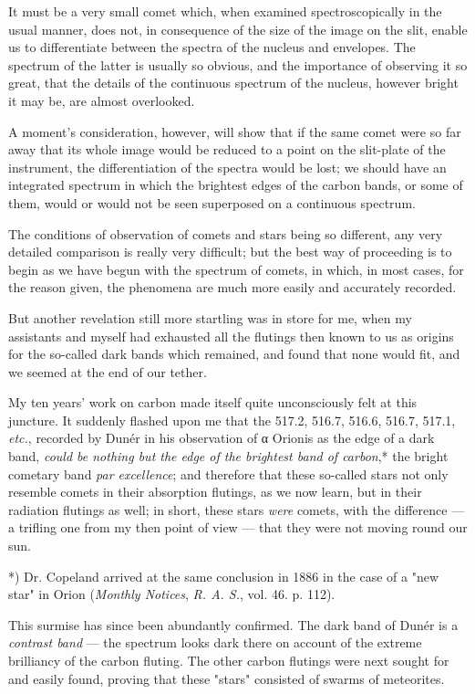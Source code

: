 \documentclass[a4paper, 12pt, oneside, polutonikogreek, english]{article}
\begin{document}
It must be a very small comet which, when examined spectroscopically in the usual manner, does not, in consequence of the size of the image on the slit, enable us to differentiate between the spectra of the nucleus and envelopes. The spectrum of the latter is usually so obvious, and the importance of observing it so great, that the details of the continuous spectrum of the nucleus, however bright it may be, are almost overlooked.

A moment's consideration, however, will show that if the same comet were so far away that its whole image would be reduced to a point on the slit-plate of the instrument, the differentiation of the spectra would be lost; we should have an integrated spectrum in which the brightest edges of the carbon bands, or some of them, would or would not be seen superposed on a continuous spectrum.

The conditions of observation of comets and stars being so different, any very detailed comparison is really very difficult; but the best way of proceeding is to begin as we have begun with the spectrum of comets, in which, in most cases, for the reason given, the phenomena are much more easily and accurately recorded.

But another revelation still more startling was in store for me, when my assistants and myself had exhausted all the flutings then known to us as origins for the so-called dark bands which remained, and found that none would fit, and we seemed at the end of our tether.

My ten years' work on carbon made itself quite unconsciously felt at this juncture. It suddenly flashed upon me that the 517.2, 516.7, 516.6, 516.7, 517.1, \emph{etc.}, recorded by Dunér in his observation of α Orionis as the edge of a dark band, \emph{could be nothing but the edge of the brightest band of carbon},* the bright cometary band \emph{par excellence}; and therefore that these so-called stars not only resemble comets in their absorption flutings, as we now learn, but in their radiation flutings as well; in short, these stars \emph{were} comets, with the difference --- a trifling one from my then point of view --- that they were not moving round our sun.

*) Dr. Copeland arrived at the same conclusion in 1886 in the case of a "new star" in Orion (\emph{Monthly Notices}, \emph{R. A. S.}, vol. 46. p. 112).

This surmise has since been abundantly confirmed. The dark band of Dunér is a \emph{contrast band} --- the spectrum looks dark there on account of the extreme brilliancy of the carbon fluting. The other carbon flutings were next sought for and easily found, proving that these "stars" consisted of swarms of meteorites.
\end{document}
